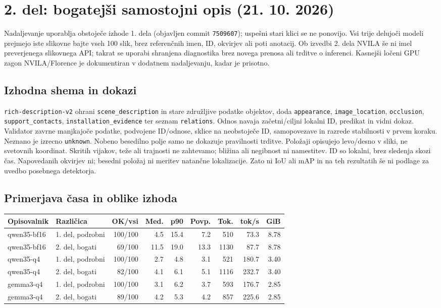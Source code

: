 \documentclass[10pt,a4paper]{article}
\begin{document}
\newpage
\section*{2. del: bogatejši samostojni opis (21. 10. 2026)}
Nadaljevanje uporablja obstoječe izhode 1. dela (objavljen commit \texttt{7509607}); uspešni stari klici se ne ponovijo. Vsi trije delujoči modeli prejmejo iste slikovne bajte vseh 100 slik, brez referenčnih imen, ID, okvirjev ali poti anotacij. Ob izvedbi 2. dela NVILA še ni imel preverjenega slikovnega API; takrat se uporabi shranjena diagnostika brez novega prenosa ali trditve o inferenci. Kasnejši ločeni GPU zagon NVILA/Florence je dokumentiran v dodatnem nadaljevanju, kadar je prisotno.
\subsection*{Izhodna shema in dokazi}
\texttt{rich-description-v2} ohrani \texttt{scene\_description} in stare združljive podatke objektov, doda \texttt{appearance}, \texttt{image\_location}, \texttt{occlusion}, \texttt{support\_contacts}, \texttt{installation\_evidence} ter seznam \texttt{relations}. Odnos navaja začetni/ciljni lokalni ID, predikat in vidni dokaz. Validator zavrne manjkajoče podatke, podvojene ID/odnose, sklice na neobstoječe ID, samopovezave in razrede stabilnosti v prvem koraku. Neznano je izrecno \texttt{unknown}. Nobeno besedilno polje samo ne dokazuje pravilnosti trditve.
Položaji opisujejo levo/desno v sliki, ne svetovnih koordinat. Skritih vijakov, teže ali trajnosti ne zahtevamo; bližina ali negibnost ni namestitev. ID so lokalni, brez sledenja skozi čas. Napovedanih okvirjev ni; besedni položaj ni meritev natančne lokalizacije. Zato ni IoU ali mAP in na teh rezultatih še ni podlage za uvedbo posebnega detektorja.
\subsection*{Primerjava časa in oblike izhoda}
\begin{center}\small\begin{tabular}{llrrrrrrr}\toprule
Opisovalnik & Različica & OK/vsi & Med. & p90 & Povp. & Tok. & tok/s & GiB \\ \midrule
qwen35-bf16 & 1. del, podrobni & 100/100 & 4.5 & 15.4 & 7.2 & 510 & 73.3 & 8.78 \\
qwen35-bf16 & 2. del, bogati & 69/100 & 11.5 & 19.0 & 13.3 & 1130 & 87.7 & 8.78 \\
qwen35-q4 & 1. del, podrobni & 100/100 & 2.7 & 4.8 & 3.1 & 521 & 180.7 & 3.40 \\
qwen35-q4 & 2. del, bogati & 82/100 & 4.1 & 6.1 & 5.1 & 1116 & 232.7 & 3.40 \\
gemma3-q4 & 1. del, podrobni & 100/100 & 3.1 & 6.2 & 3.7 & 593 & 176.7 & 2.85 \\
gemma3-q4 & 2. del, bogati & 89/100 & 4.2 & 5.3 & 4.2 & 857 & 225.6 & 2.85 \\
\bottomrule\end{tabular}\end{center}
\end{document}
